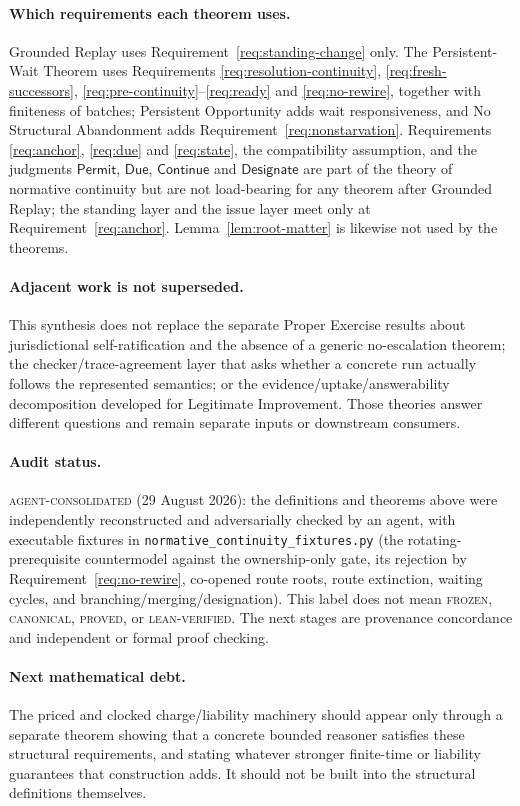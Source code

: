 \documentclass[11pt]{article}
\theoremstyle{definition}
\theoremstyle{remark}
\newcommand{\Permit}{\mathsf{Permit}}
\newcommand{\Due}{\mathsf{Due}}
\newcommand{\Continue}{\mathsf{Continue}}
\newcommand{\Designate}{\mathsf{Designate}}
\begin{document}
\paragraph{Which requirements each theorem uses.}
Grounded Replay uses Requirement~\ref{req:standing-change} only. The
Persistent-Wait Theorem uses Requirements \ref{req:resolution-continuity},
\ref{req:fresh-successors}, \ref{req:pre-continuity}--\ref{req:ready} and
\ref{req:no-rewire}, together with finiteness of batches; Persistent
Opportunity adds wait responsiveness, and No Structural Abandonment adds
Requirement~\ref{req:nonstarvation}. Requirements \ref{req:anchor},
\ref{req:due} and \ref{req:state}, the compatibility assumption, and the
judgments $\Permit$, $\Due$, $\Continue$ and $\Designate$ are part of the
theory of normative continuity but are not load-bearing for any theorem after
Grounded Replay; the standing layer and the issue layer meet only at
Requirement~\ref{req:anchor}. Lemma~\ref{lem:root-matter} is likewise not used
by the theorems.

\paragraph{Adjacent work is not superseded.}
This synthesis does not replace the separate Proper Exercise results about
jurisdictional self-ratification and the absence of a generic no-escalation
theorem; the checker/trace-agreement layer that asks whether a concrete run
actually follows the represented semantics; or the evidence/uptake/answerability
decomposition developed for Legitimate Improvement. Those theories answer
different questions and remain separate inputs or downstream consumers.

\paragraph{Audit status.}
\textsc{agent-consolidated} (29 August 2026): the definitions and theorems
above were independently reconstructed and adversarially checked by an agent,
with executable fixtures in \texttt{normative\_continuity\_fixtures.py}
(the rotating-prerequisite countermodel against the ownership-only gate, its
rejection by Requirement~\ref{req:no-rewire}, co-opened route roots, route
extinction, waiting cycles, and branching/merging/designation). This label
does not mean \textsc{frozen}, \textsc{canonical}, \textsc{proved}, or
\textsc{lean-verified}. The next stages are provenance concordance and
independent or formal proof checking.

\paragraph{Next mathematical debt.}
The priced and clocked charge/liability machinery should appear only through a
separate theorem showing that a concrete bounded reasoner satisfies these
structural requirements, and stating whatever stronger finite-time or
liability guarantees that construction adds. It should not be built into the
structural definitions themselves.
\end{document}
